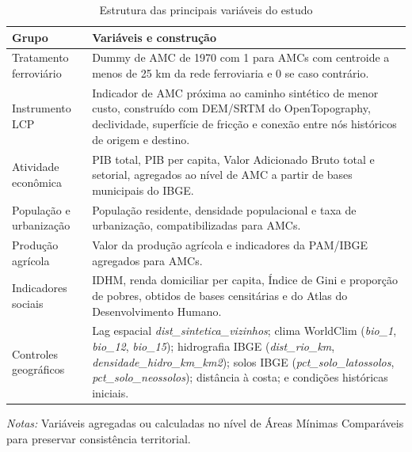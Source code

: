 \documentclass[12pt,a4paper]{article}
\begin{document}
\begin{table}[!htbp]
\centering
\scriptsize
\setlength{\tabcolsep}{3.5pt}
\renewcommand{\arraystretch}{0.80}
\caption{Estrutura das principais variáveis do estudo}
\begin{tabular}{>{\raggedright\arraybackslash}p{3.7cm}>{\raggedright\arraybackslash}p{8.9cm}}
\toprule
\textbf{Grupo} & \textbf{Variáveis e construção} \\
\midrule
Tratamento ferroviário & Dummy de AMC de 1970 com 1 para AMCs com centroide a menos de 25 km da rede ferroviaria e 0 se caso contrário. \\
Instrumento LCP & Indicador de AMC próxima ao caminho sintético de menor custo, construído com DEM/SRTM do OpenTopography, declividade, superfície de fricção e conexão entre nós históricos de origem e destino. \\
Atividade econômica & PIB total, PIB per capita, Valor Adicionado Bruto total e setorial, agregados ao nível de AMC a partir de bases municipais do IBGE. \\
População e urbanização & População residente, densidade populacional e taxa de urbanização, compatibilizadas para AMCs. \\
Produção agrícola & Valor da produção agrícola e indicadores da PAM/IBGE agregados para AMCs. \\
Indicadores sociais & IDHM, renda domiciliar per capita, Índice de Gini e proporção de pobres, obtidos de bases censitárias e do Atlas do Desenvolvimento Humano. \\
Controles geográficos & Lag espacial \textit{dist\_sintetica\_vizinhos}; clima WorldClim (\textit{bio\_1}, \textit{bio\_12}, \textit{bio\_15}); hidrografia IBGE (\textit{dist\_rio\_km}, \textit{densidade\_hidro\_km\_km2}); solos IBGE (\textit{pct\_solo\_latossolos}, \textit{pct\_solo\_neossolos}); distância à costa; e condições históricas iniciais. \\
\bottomrule
\end{tabular}
\label{tab:estrutura_variaveis}
\vspace{0.1cm}

\begin{minipage}{0.95\textwidth}
\scriptsize \textit{Notas:} Variáveis agregadas ou calculadas no nível de Áreas Mínimas Comparáveis para preservar consistência territorial.
\end{minipage}
\end{table}
\end{document}
